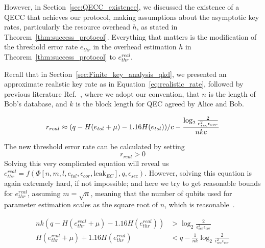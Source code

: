 \documentclass[%
 reprint,
superscriptaddress,
 amsmath,amssymb,
 aps,
]{revtex4-2}
\begin{document}
However, in Section~\ref{sec:QECC_existence}, we discussed the existence of a QECC that achieves our protocol, making assumptions about the asymptotic key rates, particularly the resource overhead $h$, as stated in Theorem~\ref{thm:success_protocol}. Everything that matters is the modification of the threshold error rate $e_{thr}$ in the overhead estimation $h$ in Theorem~\ref{thm:success_protocol} to $e_{thr}^{real}$.

Recall that in Section~\ref{sec:Finite_key_analysis_qkd}, we presented an approximate realistic key rate as in Equation~\ref{eq:realistic_rate}, followed by previous literature Ref.~\cite{Rates_for_realistic_code1, Rates_for_realistic_code2, Rates_for_realistic_code3, Finite_key_analysis1, Finite_key_analysis2, Finite_key_analysis3}, where we adopt our convention, that $n$ is the length of Bob's database, and $k$ is the block length for QEC agreed by Alice and Bob.

\begin{equation}
    r_{real}\approx (q-H(e_{tol}+\mu)-1.16H(e_{tol}))/c-\frac{\log_2 \frac{2}{\epsilon_{sec}^2\epsilon_{cor}}}{nkc}\\
    \label{eq:realistic_rate}
\end{equation}

The new threshold error rate can be calculated by setting
\begin{equation}
    r_{real}>0
\end{equation}
Solving this very complicated equation will reveal us $e_{thr}^{real} = f(\Phi[n, m, l, e_{tol}, \epsilon_{cor}, \text{leak}_{EC}], q, \epsilon_{sec})$. However, solving this equation is again extremely hard, if not impossible; and here we try to get reasonable bounds for $e_{thr}^{real}$, assuming $m=\sqrt{n}$, meaning that the number of qubits used for parameter estimation scales as the square root of $n$, which is reasonable~\cite{Finite_key_analysis1, Finite_key_analysis2, Finite_key_analysis3}.

\begin{equation}
    \begin{split}
        nk(q-H(e_{thr}^{real}+\mu)-1.16H(e_{thr}^{real}))&>\log_2 \frac{2}{\epsilon_{sec}^2\epsilon_{cor}}\\
        H(e_{thr}^{real}+\mu)+1.16H(e_{thr}^{real})&<q-\frac{1}{nk}\log_2 \frac{2}{\epsilon_{sec}^2\epsilon_{cor}}\\
    \end{split}
\end{equation}
\end{document}
